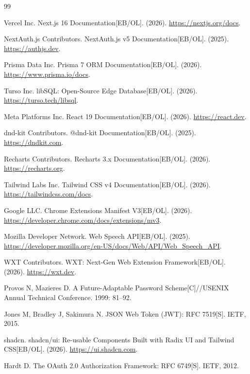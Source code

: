\documentclass[a4paper,12pt]{ctexart}
\begin{document}
\begin{thebibliography}{99}

Vercel Inc. Next.js 16 Documentation[EB/OL]. (2026). \url{https://nextjs.org/docs}.

NextAuth.js Contributors. NextAuth.js v5 Documentation[EB/OL]. (2025). \url{https://authjs.dev}.

Prisma Data Inc. Prisma 7 ORM Documentation[EB/OL]. (2026). \url{https://www.prisma.io/docs}.

Turso Inc. libSQL: Open-Source Edge Database[EB/OL]. (2026). \url{https://turso.tech/libsql}.

Meta Platforms Inc. React 19 Documentation[EB/OL]. (2026). \url{https://react.dev}.

dnd-kit Contributors. @dnd-kit Documentation[EB/OL]. (2025). \url{https://dndkit.com}.

Recharts Contributors. Recharts 3.x Documentation[EB/OL]. (2026). \url{https://recharts.org}.

Tailwind Labs Inc. Tailwind CSS v4 Documentation[EB/OL]. (2026). \url{https://tailwindcss.com/docs}.

Google LLC. Chrome Extensions Manifest V3[EB/OL]. (2026). \url{https://developer.chrome.com/docs/extensions/mv3}.

Mozilla Developer Network. Web Speech API[EB/OL]. (2025). \url{https://developer.mozilla.org/en-US/docs/Web/API/Web_Speech_API}.

WXT Contributors. WXT: Next-Gen Web Extension Framework[EB/OL]. (2026). \url{https://wxt.dev}.

Provos N, Mazieres D. A Future-Adaptable Password Scheme[C]//USENIX Annual Technical Conference. 1999: 81--92.

Jones M, Bradley J, Sakimura N. JSON Web Token (JWT): RFC 7519[S]. IETF, 2015.

shadcn. shadcn/ui: Re-usable Components Built with Radix UI and Tailwind CSS[EB/OL]. (2026). \url{https://ui.shadcn.com}.

Hardt D. The OAuth 2.0 Authorization Framework: RFC 6749[S]. IETF, 2012.

\end{thebibliography}
\end{document}
